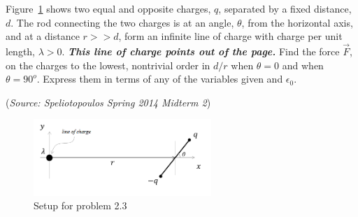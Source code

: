 \documentclass{article}
\begin{document}
Figure~\ref{Spelio} shows two equal and opposite charges, $q$, separated by a fixed distance, $d$. The rod connecting the two charges is at an angle, $\theta$, from the horizontal axis, and at a distance $r>>d$, form an infinite line of charge with charge per unit length, $\lambda>0$. \textit{\textbf{This line of charge points out of the page.}} Find the force $\vec{F}$, on the charges to the lowest, nontrivial order in $d/r$ when $\theta=0$ and when $\theta=90^o$. Express them in terms of any of the variables given and $\epsilon_0$.

(\textit{Source: Speliotopoulos Spring 2014 Midterm 2})

\begin{figure}[h]
	\centering
	\includegraphics[width=0.6\textwidth]{SpelioProblem.png}
	\caption{Setup for problem 2.3}
	\label{Spelio}
\end{figure}
\end{document}
